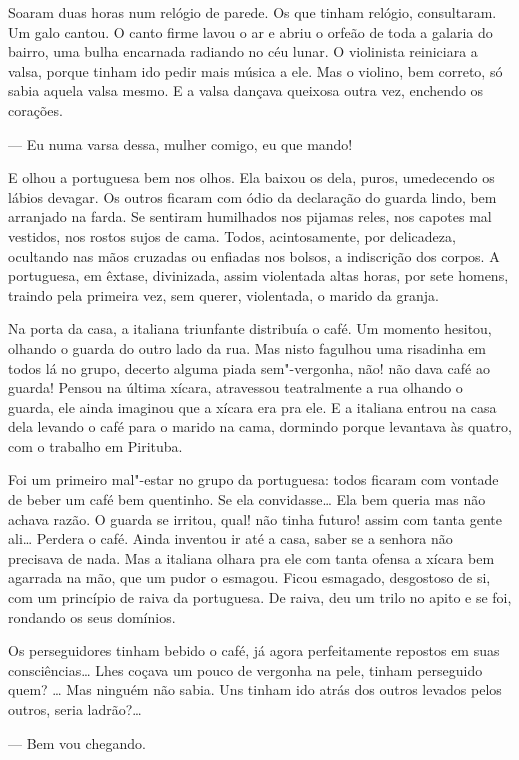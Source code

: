 \begin{linenumbers}
Soaram duas horas num relógio de parede. Os que tinham relógio,
consultaram. Um galo cantou. O canto firme lavou o ar e abriu o orfeão
de toda a galaria do bairro, uma bulha encarnada radiando no céu lunar.
O violinista reiniciara a valsa, porque tinham ido pedir mais música a
ele. Mas o violino, bem correto, só sabia aquela valsa mesmo. E a valsa
dançava queixosa outra vez, enchendo os corações.

--- Eu numa varsa dessa, mulher comigo, eu que mando!

E olhou a portuguesa bem nos olhos. Ela baixou os dela, puros,
umedecendo os lábios devagar. Os outros ficaram com ódio da declaração
do guarda lindo, bem arranjado na farda. Se sentiram humilhados nos
pijamas reles, nos capotes mal vestidos, nos rostos sujos de cama.
Todos, acintosamente, por delicadeza, ocultando nas mãos cruzadas ou
enfiadas nos bolsos, a indiscrição dos corpos. A portuguesa, em êxtase,
divinizada, assim violentada altas horas, por sete homens, traindo pela
primeira vez, sem querer, violentada, o marido da granja.

Na porta da casa, a italiana triunfante distribuía o café. Um momento
hesitou, olhando o guarda do outro lado da rua. Mas nisto fagulhou uma
risadinha em todos lá no grupo, decerto alguma piada sem"-vergonha, não!
não dava café ao guarda! Pensou na última xícara, atravessou
teatralmente a rua olhando o guarda, ele ainda imaginou que a xícara era
pra ele. E a italiana entrou na casa dela levando o café para o marido
na cama, dormindo porque levantava às quatro, com o trabalho em
Pirituba.

Foi um primeiro mal"-estar no grupo da portuguesa: todos ficaram com
vontade de beber um café bem quentinho. Se ela convidasse\ldots{} Ela bem
queria mas não achava razão. O guarda se irritou, qual! não tinha
futuro! assim com tanta gente ali\ldots{} Perdera o café. Ainda inventou ir
até a casa, saber se a senhora não precisava de nada. Mas a italiana
olhara pra ele com tanta ofensa a xícara bem agarrada na mão, que um
pudor o esmagou. Ficou esmagado, desgostoso de si, com um princípio de
raiva da portuguesa. De raiva, deu um trilo no apito e se foi, rondando
os seus domínios.

Os perseguidores tinham bebido o café, já agora perfeitamente repostos
em suas consciências\ldots{} Lhes coçava um pouco de vergonha na pele, tinham
perseguido quem? \ldots{} Mas ninguém não sabia. Uns tinham ido atrás dos
outros levados pelos outros, seria ladrão?\ldots{}

--- Bem vou chegando.


\end{linenumbers}
